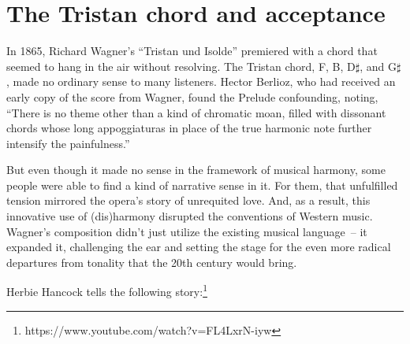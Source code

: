\section{The Tristan chord and acceptance} \label{sec:tristan}
In 1865, Richard Wagner's \enquote{Tristan und Isolde} premiered with a
chord that seemed to hang in the air without resolving. The Tristan
chord, F, B, D\(\sharp\), and G\(\sharp\), made no ordinary sense to
many listeners. Hector Berlioz, who had received an early copy of the
score from Wagner, found the Prelude confounding, noting, \enquote{There
is no theme other than a kind of chromatic moan, filled with dissonant
chords whose long appoggiaturas in place of the true harmonic note
further intensify the painfulness.} %

But even though it made no sense in the framework of musical harmony, some people were able to find a kind of narrative sense in it. For them, that unfulfilled tension mirrored the opera's story of unrequited love. And, as a result, this innovative use of (dis)harmony disrupted the conventions of Western music. Wagner's composition didn't just utilize the existing musical language~-- it expanded it, challenging the ear and setting the stage for the even more radical departures from tonality that the 20th century would bring.

Herbie Hancock tells the following story:\footnote{https://www.youtube.com/watch?v=FL4LxrN-iyw}

